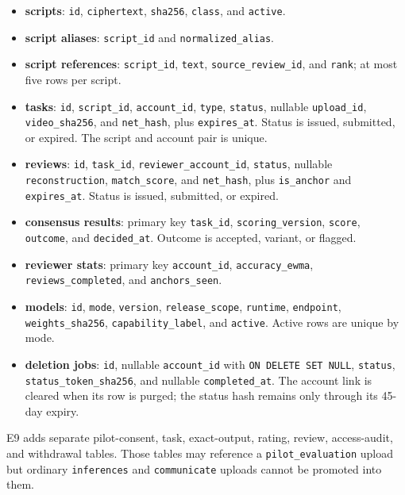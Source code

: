 \documentclass[11pt]{article}
\newcommand{\code}[1]{\texttt{#1}}
\begin{document}
{\begin{itemize}[nosep]
        transcript text, or output-derived hashes.
  \item \textbf{scripts}: \code{id}, \code{ciphertext}, \code{sha256},
        \code{class}, and \code{active}.
  \item \textbf{script aliases}: \code{script\_id} and
        \code{normalized\_alias}.
  \item \textbf{script references}: \code{script\_id}, \code{text},
        \code{source\_review\_id}, and \code{rank}; at most five rows per script.
  \item \textbf{tasks}: \code{id}, \code{script\_id}, \code{account\_id},
        \code{type}, \code{status}, nullable \code{upload\_id},
        \code{video\_sha256}, and \code{net\_hash}, plus \code{expires\_at}.
        Status is issued, submitted, or expired. The script and account pair is
        unique.
  \item \textbf{reviews}: \code{id}, \code{task\_id},
        \code{reviewer\_account\_id}, \code{status}, nullable
        \code{reconstruction}, \code{match\_score}, and \code{net\_hash}, plus
        \code{is\_anchor} and \code{expires\_at}. Status is issued, submitted, or
        expired.
  \item \textbf{consensus results}: primary key \code{task\_id},
        \code{scoring\_version}, \code{score}, \code{outcome}, and
        \code{decided\_at}. Outcome is accepted, variant, or flagged.
  \item \textbf{reviewer stats}: primary key \code{account\_id},
        \code{accuracy\_ewma}, \code{reviews\_completed}, and
        \code{anchors\_seen}.
  \item \textbf{models}: \code{id}, \code{mode}, \code{version},
        \code{release\_scope}, \code{runtime}, \code{endpoint},
        \code{weights\_sha256}, \code{capability\_label}, and \code{active}.
        Active rows are unique by mode.
  \item \textbf{deletion jobs}: \code{id}, nullable \code{account\_id} with
        \code{ON DELETE SET NULL}, \code{status},
        \code{status\_token\_sha256}, and nullable \code{completed\_at}. The account
        link is cleared when its row is purged; the status hash remains only through
        its 45-day expiry.
\end{itemize}
}

E9 adds separate pilot-consent, task, exact-output, rating, review, access-audit, and
withdrawal tables. Those tables may reference a \code{pilot\_evaluation} upload but
ordinary \code{inferences} and \code{communicate} uploads cannot be promoted into
them.
\end{document}
